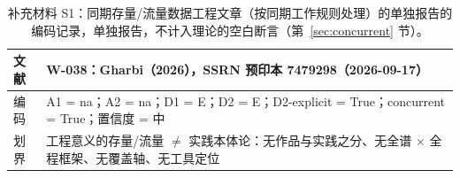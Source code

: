 \documentclass[10pt,fontset=fandol]{ctexart}
\begin{document}
\begin{table}[h]
\centering
\caption{补充材料 S1：同期存量/流量数据工程文章（按同期工作规则处理）的单独报告的编码记录，单独报告，不计入理论的空白断言（第~\ref{sec:concurrent} 节）。}
\label{tab:gharbi}
\small
\begin{tabular}{p{}p{}}
\toprule
文献 & W-038：Gharbi（2026），SSRN 预印本 7479298（2026-09-17） \\
\midrule
编码 & A1 = na；A2 = na；D1 = E；D2 = E；D2-explicit = True；concurrent = True；置信度 = 中 \\
划界 & 工程意义的存量/流量 $\neq$ 实践本体论：无作品与实践之分、无全谱 $\times$ 全程框架、无覆盖轴、无工具定位 \\
\bottomrule
\end{tabular}
\end{table}



\end{document}
